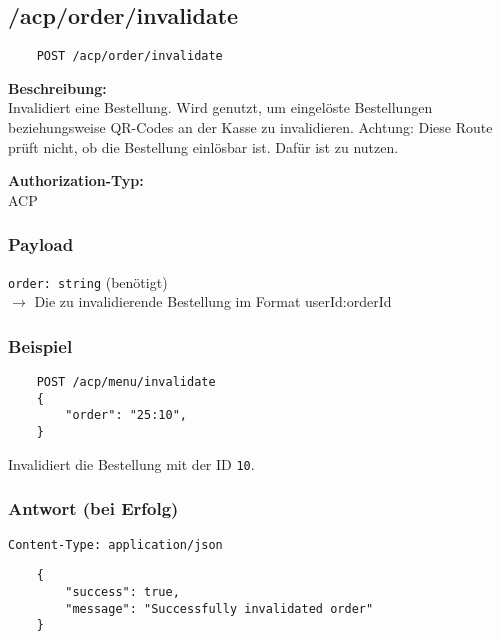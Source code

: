 \subsection{/acp/order/invalidate}

\begin{lstlisting}
    POST /acp/order/invalidate
\end{lstlisting}

\textbf{Beschreibung:} \\
Invalidiert eine Bestellung. Wird genutzt, um eingelöste Bestellungen beziehungsweise QR-Codes an der Kasse zu invalidieren. Achtung: Diese Route prüft nicht, ob die Bestellung einlösbar ist. Dafür ist  zu nutzen.

\textbf{Authorization-Typ:} \\
ACP

\subsubsection{Payload}

\lstinline{order: string} (benötigt) \\
$\rightarrow$ Die zu invalidierende Bestellung im Format \glqq userId:orderId\grqq

\subsubsection{Beispiel}

\begin{lstlisting}
    POST /acp/menu/invalidate
    {
        "order": "25:10",
    }
\end{lstlisting}

Invalidiert die Bestellung mit der ID \lstinline{10}.

\subsubsection{Antwort (bei Erfolg)}

\lstinline{Content-Type: application/json}
\begin{lstlisting}
    {
        "success": true, 
        "message": "Successfully invalidated order"
    }
\end{lstlisting}